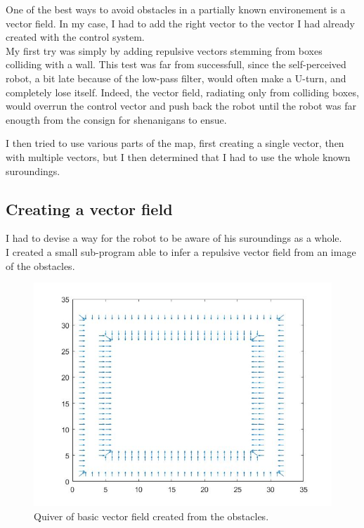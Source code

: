 One of the best ways to avoid obstacles in a partially known environement is a vector field.
In my case, I had to add the right vector to the vector I had already created with the control system.\\

My first try was simply by adding repulsive vectors stemming from boxes colliding with a wall.
This test was far from successfull, since the self-perceived robot, a bit late because of the low-pass filter, would often make a U-turn, and completely lose itself.
Indeed, the vector field, radiating only from colliding boxes, would overrun the control vector and push back the robot until the robot was far enougth from the consign for shenanigans to ensue.

I then tried to use various parts of the map, first creating a single vector, then with multiple vectors, but I then determined that I had to use the whole known suroundings.

\subsection{Creating a vector field}
\label{vectf}

I had to devise a way for the robot to be aware of his suroundings as a whole.\\



I created a small sub-program able to infer a repulsive vector field from an image of the obstacles.\\

\begin{figure}[H]
\centering
\includegraphics[scale=0.4]{Figures/quiver1}
\decoRule
\caption[Basic Quiver]{Quiver of basic vector field created from the obstacles.}
\label{fig:quiver1}
\end{figure}


